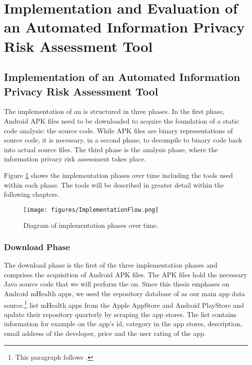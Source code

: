 \section{Implementation and Evaluation of an Automated Information Privacy Risk Assessment Tool}

\subsection{Implementation of an Automated Information Privacy Risk Assessment Tool}

The implementation of an \aiprat is structured in three phases.
In the first phase, Android APK files need to be downloaded to acquire the foundation of a static code analysis: the source code.
While APK files are binary representations of source code, it is necessary, in a second phase, to decompile to binary code back into actual source files.
The third phase is the analysis phase, where the information privacy risk assessment takes place.

Figure \ref{fig:implementationPhases} shows the implementation phases over time including the tools used within each phase. 
The tools will be described in greater detail within the following chapters.

\begin{figure}[h]
	\caption{Diagram of implementation phases over time.}
	\centering
	\texttt{[image: figures/ImplementationFlow.png]}
	\label{fig:implementationPhases}
\end{figure}

\subsubsection{Download Phase}

The download phase is the first of the three implementation phases and comprises the acquisition of Android APK files. 
The APK files hold the necessary Java source code that we will perform the \sca on.
Since this thesis emphases on Android mHealth apps, we used the repository database of \cite{Xu2015} as our main app data source.\footnote{This paragraph follows \cite{Xu2015}.}
\cite{Xu2015} list mHealth apps from the Apple AppStore and Android PlayStore and update their repository quarterly by scraping the app stores.
The list contains information for example on the app's id, category in the app stores, description, email address of the developer, price and the user rating of the app.

